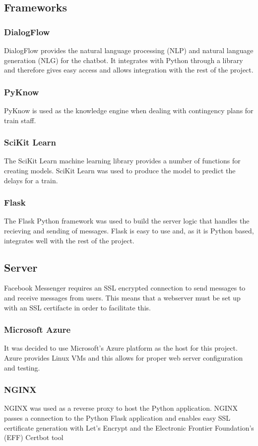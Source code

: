 \documentclass[12pt,a4paper]{article}
\begin{document}
    \subsection*{Frameworks}
    \subsubsection*{DialogFlow}
    DialogFlow provides the natural language processing (NLP) and natural language generation (NLG) for the chatbot. It integrates with Python through a library and therefore gives easy access and allows integration with the rest of the project.
    \subsubsection*{PyKnow}
    PyKnow is used as the knowledge engine when dealing with contingency plans for train staff. 
    \subsubsection*{SciKit Learn}
    The SciKit Learn machine learning library provides a number of functions for creating models. SciKit Learn was used to produce the model to predict the delays for a train.
    \subsubsection*{Flask}
    The Flask Python framework was used to build the server logic that handles the recieving and sending of messages. Flask is easy to use and, as it is Python based, integrates well with the rest of the project.
    \subsection*{Server}
    Facebook Messenger requires an SSL encrypted connection to send messages to and receive messages from users. This means that a webserver must be set up with an SSL certifacte in order to facilitate this.
    \subsubsection*{Microsoft Azure}
    It was decided to use Microsoft's Azure platform as the host for this project. Azure provides Linux VMs and this allows for proper web server configuration and testing.
    \subsubsection*{NGINX}
    NGINX was used as a reverse proxy to host the Python application. NGINX passes a connection to the Python Flask application and enables easy SSL certificate generation with Let's Encrypt and the Electronic Frontier Foundation's (EFF) Certbot tool %
\end{document}
